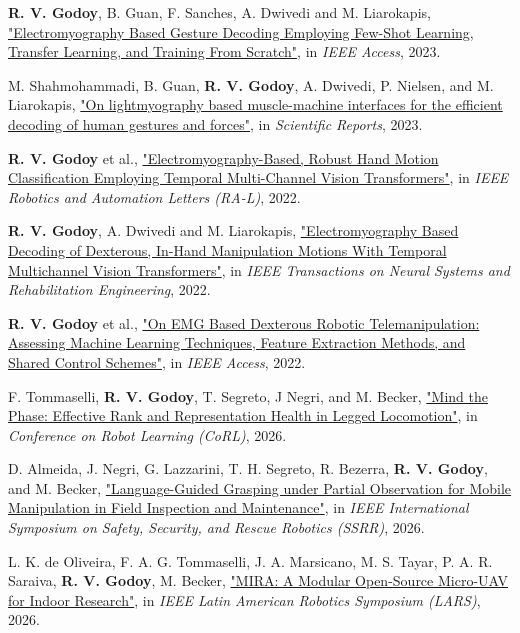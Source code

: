\begin{cvparagraph}
\textbf{R. V. Godoy}, B. Guan, F. Sanches, A. Dwivedi and M. Liarokapis, \href{https://ieeexplore.ieee.org/document/10258264}{"Electromyography Based Gesture Decoding Employing Few-Shot Learning, Transfer Learning, and Training From Scratch"}, in \textit{IEEE Access}, 2023.

M. Shahmohammadi, B. Guan, \textbf{R. V. Godoy}, A. Dwivedi, P. Nielsen, and M. Liarokapis, \href{https://www.nature.com/articles/s41598-022-25982-w}{"On lightmyography based muscle-machine interfaces for the efficient decoding of human gestures and forces"}, in \textit{Scientific Reports}, 2023.

\textbf{R. V. Godoy} et al., \href{https://ieeexplore.ieee.org/document/9834070}{"Electromyography-Based, Robust Hand Motion Classification Employing Temporal Multi-Channel Vision Transformers"}, in \textit{IEEE Robotics and Automation Letters (RA-L)}, 2022.

\textbf{R. V. Godoy}, A. Dwivedi and M. Liarokapis, \href{https://ieeexplore.ieee.org/document/9851477}{"Electromyography Based Decoding of Dexterous, In-Hand Manipulation Motions With Temporal Multichannel Vision Transformers"}, in \textit{IEEE Transactions on Neural Systems and Rehabilitation Engineering}, 2022.

\textbf{R. V. Godoy} et al., \href{https://ieeexplore.ieee.org/document/9889719}{"On EMG Based Dexterous Robotic Telemanipulation: Assessing Machine Learning Techniques, Feature Extraction Methods, and Shared Control Schemes"}, in \textit{IEEE Access}, 2022.

\vspace{5pt} 

F. Tommaselli, \textbf{R. V. Godoy}, T. Segreto, J Negri, and M. Becker, \href{https://felipe-tommaselli.github.io/MindThePhase/}{"Mind the Phase: Effective Rank and Representation Health in Legged Locomotion"}, in \textit{Conference on Robot Learning (CoRL)}, 2026.

D. Almeida, J. Negri, G. Lazzarini, T. H. Segreto, R. Bezerra, \textbf{R. V. Godoy}, and M. Becker, \href{https://www.ricardovgodoy.com/publication/2026-vlm-grasp}{"Language-Guided Grasping under Partial Observation for Mobile
Manipulation in Field Inspection and Maintenance"}, in \textit{IEEE International Symposium on Safety, Security, and Rescue Robotics (SSRR)}, 2026.

L. K. de Oliveira,  F. A. G. Tommaselli, J. A. Marsicano, M. S. Tayar, P. A. R. Saraiva, \textbf{R. V. Godoy}, M. Becker, \href{https://arxiv.org/abs/2607.11785}{"MIRA: A Modular Open-Source Micro-UAV for Indoor Research"}, in \textit{IEEE Latin American Robotics Symposium (LARS)}, 2026. 


\end{cvparagraph}
